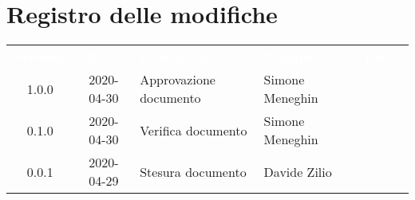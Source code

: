 \section*{Registro delle modifiche}
{
	\centering
	\begin{longtable}{ c c C{4cm}  C{4cm}  C{3cm} }
		\textcolor{white}{\textbf{Versione}} & \textcolor{white}{\textbf{Data}} & \textcolor{white}{\textbf{Descrizione}} & \textcolor{white}{\textbf{Nominativo}} & \textcolor{white}{\textbf{Ruolo}}\\		
		1.0.0 & 2020-04-30 & Approvazione documento & Simone Meneghin &\RdP{}\\		
		0.1.0 & 2020-04-30 & Verifica documento & Simone Meneghin &\ver{}\\		
		0.0.1 & 2020-04-29 & Stesura documento & Davide Zilio &\reda{}\\		
		
	\end{longtable}

}